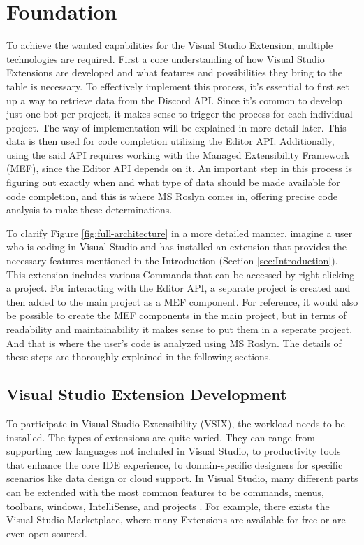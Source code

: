 \section{Foundation}
\label{sec:Foundation}
  
To achieve the wanted capabilities for the Visual Studio Extension, multiple technologies are required. First a core understanding of how Visual Studio Extensions are developed and what features and possibilities they bring to the table is necessary. To effectively implement this process, it's essential to first set up a way to retrieve data from the Discord API. Since it's common to develop just one bot per \csharp project, it makes sense to trigger the process for each individual project. The way of implementation will be explained in more detail later. This data is then used for code completion utilizing the Editor API. Additionally, using the said API requires working with the Managed Extensibility Framework (MEF), since the Editor API depends on it. An important step in this process is figuring out exactly when and what type of data should be made available for code completion, and this is where MS Roslyn comes in, offering precise code analysis to make these determinations.


To clarify Figure \ref{fig:full-architecture} in a more detailed manner, imagine a user who is coding in Visual Studio and has installed an extension that provides the necessary features mentioned in the Introduction (Section \ref{sec:Introduction}). This extension includes various Commands that can be accessed by right clicking a project. For interacting with the Editor API, a separate project is created and then added to the main project as a MEF component. For reference, it would also be possible to create the MEF components in the main project, but in terms of readability and maintainability it makes sense to put them in a seperate project. And that is where the user's code is analyzed using MS Roslyn. The details of these steps are thoroughly explained in the following sections.
\newpage


\subsection{Visual Studio Extension Development}
\label{ssec:VisualStudioExtensionDevelopmentArchitecture}
To participate in Visual Studio Extensibility (VSIX), the workload needs to be installed.
The types of extensions are quite varied. They can range from supporting new languages not included in Visual Studio, to productivity tools that enhance the core IDE experience, to domain-specific designers for specific scenarios like data design or cloud support. In Visual Studio, many different parts can be extended with the most common features to be commands, menus, toolbars, windows, IntelliSense, and projects \citep{whatisvsextension}. For example, there exists the Visual Studio Marketplace, where many Extensions are available for free or are even open sourced.
\newpage
 
